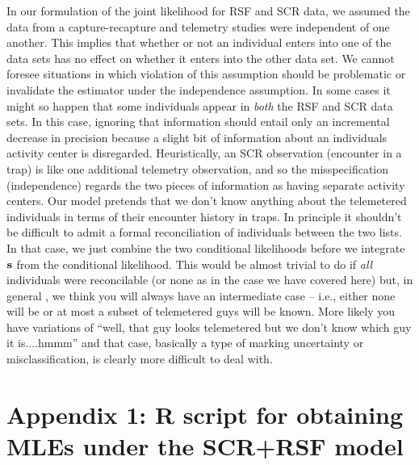 In our formulation of the joint likelihood for RSF and SCR data, we
assumed the data from a capture-recapture and telemetry studies were
independent of one another. This implies that whether or not an
individual enters into one of the data sets has no effect on whether
it enters into the other data set. We cannot foresee situations in
which violation of this assumption should be problematic or invalidate
the estimator under the independence assumption.  In some cases it
might so happen that some individuals appear in {\it both} the RSF and
SCR data sets. In this case, ignoring that information should entail
only an incremental decrease in precision because a slight bit of
information about an individuals activity center is
disregarded. Heuristically, an SCR observation (encounter in a trap)
is like one additional telemetry observation, and so the
misspecification (independence)
regards the
two pieces of information as having separate activity centers.
 Our model pretends that we don't know anything
about the telemetered individuals in terms of their encounter history
in traps.  In principle it shouldn't be difficult to admit a formal
reconciliation of individuals between the two lists. In that case, we
just combine the two conditional likelihoods before we integrate ${\bf
  s}$ from the conditional likelihood. This would be almost trivial to
do if {\it all} individuals were reconcilable (or none as in the case
we have covered here) but, in general , we think you will always have
an intermediate case -- i.e., either none will be or at most a subset
of telemetered guys will be known. More likely you have variations of ``well, that
guy looks telemetered but we don't know which guy it is....hmmm'' and
that case, basically a type of marking uncertainty or
misclassification, is clearly more difficult to deal with.



























\section*{Appendix 1: {\bf R} script for obtaining MLEs under the SCR+RSF model}






















